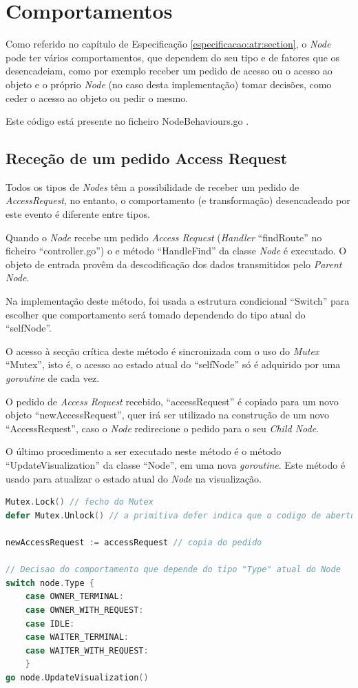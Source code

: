 \section{Comportamentos}
Como referido no capítulo de Especificação \ref{especificacao:atr:section}, 
o \emph{Node} pode ter vários comportamentos, 
que dependem do seu tipo e de fatores que os desencadeiam, como por exemplo receber um pedido de acesso ou o acesso ao objeto e 
o próprio \emph{Node} (no caso desta implementação) tomar decisões, como ceder o acesso ao objeto ou pedir o mesmo.

Este código está presente no ficheiro NodeBehaviours.go .

\subsection{Receção de um pedido Access Request}
Todos os tipos de \emph{Nodes} têm a possibilidade de receber um pedido de \emph{AccessRequest}, no entanto, o comportamento (e transformação) desencadeado por este evento é diferente entre tipos.

Quando o \emph{Node} recebe um pedido \emph{Access Request} (\emph{Handler} ``findRoute'' no ficheiro ``controller.go'') o
e método ``HandleFind'' da classe \emph{Node} é executado.
O objeto de entrada provêm da descodificação dos dados transmitidos pelo \emph{Parent Node}.

Na implementação deste método, foi usada a estrutura condicional ``Switch'' para escolher que comportamento será tomado 
dependendo do tipo atual do ``selfNode''.

O acesso à secção crítica deste método é sincronizada com o uso do \emph{Mutex} ``Mutex'', isto é,
o acesso ao estado atual do ``selfNode'' só é adquirido por uma \emph{goroutine} de cada vez.

O pedido de \emph{Access Request} recebido, ``accessRequest'' é copiado para um novo objeto ``newAccessRequest'',
quer irá ser utilizado na construção de um novo ``AccessRequest'',
caso o \emph{Node} redirecione o pedido para o seu \emph{Child Node}.

O último procedimento a ser executado neste método é o método ``UpdateVisualization'' da classe ``Node'', em uma nova \emph{goroutine}.
Este método é usado para atualizar o estado atual do \emph{Node} na visualização.

\begin{lstlisting}[caption={\emph{Switch} de decisão do comportamento.},language=Go]
Mutex.Lock() // fecho do Mutex
defer Mutex.Unlock() // a primitiva defer indica que o codigo de abertura do Mutex sera corrido caso a execucao deste metodo termine

newAccessRequest := accessRequest // copia do pedido

// Decisao do comportamento que depende do tipo "Type" atual do Node
switch node.Type {
	case OWNER_TERMINAL:
	case OWNER_WITH_REQUEST:
	case IDLE:
	case WAITER_TERMINAL:
	case WAITER_WITH_REQUEST:
	}
go node.UpdateVisualization()
\end{lstlisting}

